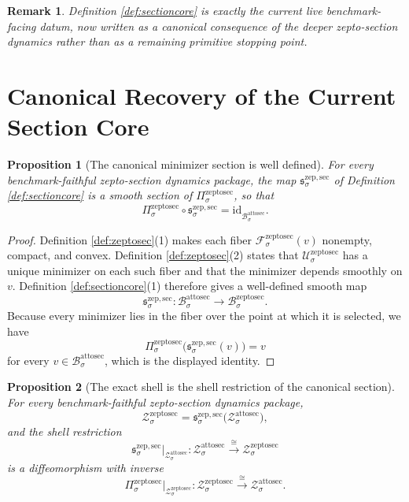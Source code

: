 \documentclass[11pt]{article}
\newcommand{\AttoSectionBody}[1]{\mathcal B_{#1}^{\mathrm{attosec}}}
\newcommand{\AttoSectionShell}[1]{\mathcal Z_{#1}^{\mathrm{attosec}}}
\newcommand{\ZeptoSectionBody}[1]{\mathcal B_{#1}^{\mathrm{zeptosec}}}
\newcommand{\ZeptoSectionProj}[1]{\Pi_{#1}^{\mathrm{zeptosec}}}
\newcommand{\ZeptoSectionFiber}[2]{\mathcal F_{#1}^{\mathrm{zeptosec}}(#2)}
\newcommand{\ZeptoSectionFunctional}[1]{\mathscr U_{#1}^{\mathrm{zeptosec}}}
\newcommand{\ZeptoSectionShell}[1]{\mathcal Z_{#1}^{\mathrm{zeptosec}}}
\newcommand{\ZeptoMinSection}[1]{\mathfrak s_{#1}^{\mathrm{zep,sec}}}
\newtheorem{proposition}{Proposition}
\newtheorem{remark}{Remark}
\begin{document}
\begin{remark}
Definition \ref{def:sectioncore} is exactly the current live benchmark-facing datum, now written as a canonical consequence of the deeper zepto-section dynamics rather than as a remaining primitive stopping point.
\end{remark}

\section{Canonical Recovery of the Current Section Core}

\begin{proposition}[The canonical minimizer section is well defined]
\label{prop:section}
For every benchmark-faithful zepto-section dynamics package, the map \(\ZeptoMinSection{\sigma}\) of Definition \ref{def:sectioncore} is a smooth section of \(\ZeptoSectionProj{\sigma}\), so that
\[
\ZeptoSectionProj{\sigma}\circ\ZeptoMinSection{\sigma}
=
\mathrm{id}_{\AttoSectionBody{\sigma}}.
\]
\end{proposition}

\begin{proof}
Definition \ref{def:zeptosec}(1) makes each fiber \(\ZeptoSectionFiber{\sigma}{v}\) nonempty, compact, and convex. Definition \ref{def:zeptosec}(2) states that \(\ZeptoSectionFunctional{\sigma}\) has a unique minimizer on each such fiber and that the minimizer depends smoothly on \(v\). Definition \ref{def:sectioncore}(1) therefore gives a well-defined smooth map
\[
\ZeptoMinSection{\sigma}:\AttoSectionBody{\sigma}\to\ZeptoSectionBody{\sigma}.
\]
Because every minimizer lies in the fiber over the point at which it is selected, we have
\[
\ZeptoSectionProj{\sigma}\bigl(\ZeptoMinSection{\sigma}(v)\bigr)=v
\]
for every \(v\in\AttoSectionBody{\sigma}\), which is the displayed identity.
\end{proof}

\begin{proposition}[The exact shell is the shell restriction of the canonical section]
\label{prop:shell}
For every benchmark-faithful zepto-section dynamics package,
\[
\ZeptoSectionShell{\sigma}
=
\ZeptoMinSection{\sigma}\bigl(\AttoSectionShell{\sigma}\bigr),
\]
and the shell restriction
\[
\ZeptoMinSection{\sigma}\big|_{\AttoSectionShell{\sigma}}
:
\AttoSectionShell{\sigma}\xrightarrow{\cong}\ZeptoSectionShell{\sigma}
\]
is a diffeomorphism with inverse
\[
\ZeptoSectionProj{\sigma}\big|_{\ZeptoSectionShell{\sigma}}
:
\ZeptoSectionShell{\sigma}\xrightarrow{\cong}\AttoSectionShell{\sigma}.
\]
\end{proposition}
\end{document}
